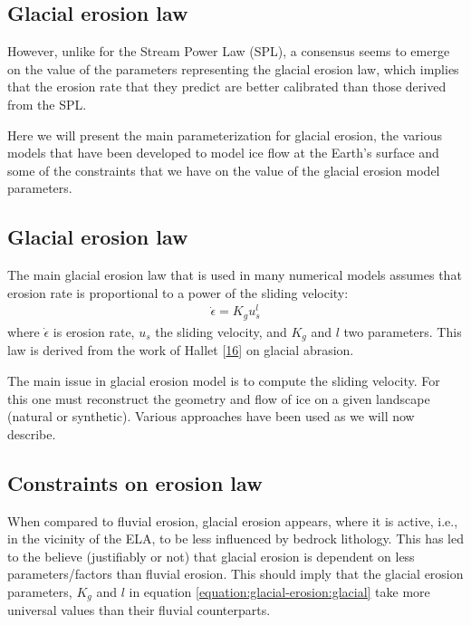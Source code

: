 \documentclass[letterpaper,10pt,english]{jupyterBook}
\begin{document}
\subsection{Glacial erosion law}
\label{\detokenize{glacial:glacial-erosion-law}}
\sphinxAtStartPar
However, unlike for the Stream Power Law (SPL), a consensus seems to emerge on the value of the parameters representing the glacial erosion law, which implies that the erosion rate that they predict are better calibrated than those derived from the SPL.

\sphinxAtStartPar
Here we will present the main parameterization for glacial erosion, the various models that have been developed to model ice flow at the Earth’s surface and some of the constraints that we have on the value of the glacial erosion model parameters.

\sphinxstepscope


\subsection{Glacial erosion law}
\label{\detokenize{glacial-erosion:glacial-erosion-law}}\label{\detokenize{glacial-erosion::doc}}
\sphinxAtStartPar
The main glacial erosion law that is used in many numerical models assumes that erosion rate is proportional to a power of the sliding velocity:
\begin{equation}\label{equation:glacial-erosion:glacial}
\begin{split}\dot\epsilon=K_gu_s^l\end{split}
\end{equation}
\sphinxAtStartPar
where \(\dot\epsilon\) is erosion rate, \(u_s\) the sliding velocity, and \(K_g\) and \(l\) two parameters. This law is derived from the work of Hallet {[}\hyperlink{cite.references:id15}{16}{]} on glacial abrasion.

\sphinxAtStartPar
The main issue in glacial erosion model is to compute the sliding velocity. For this one must reconstruct the geometry and flow of ice on a given landscape (natural or synthetic). Various approaches have been used as we will now describe.

\sphinxstepscope


\subsection{Constraints on erosion law}
\label{\detokenize{glacial-constraints:constraints-on-erosion-law}}\label{\detokenize{glacial-constraints::doc}}
\sphinxAtStartPar
When compared to fluvial erosion, glacial erosion appears, where it is active, i.e., in the vicinity of the ELA, to be less influenced by bedrock lithology. This has led to the believe (justifiably or not) that glacial erosion is dependent on less parameters/factors than fluvial erosion. This should imply that the glacial erosion parameters, \(K_g\) and \(l\) in equation \eqref{equation:glacial-erosion:glacial} take more universal values than their fluvial counterparts.
\end{document}
